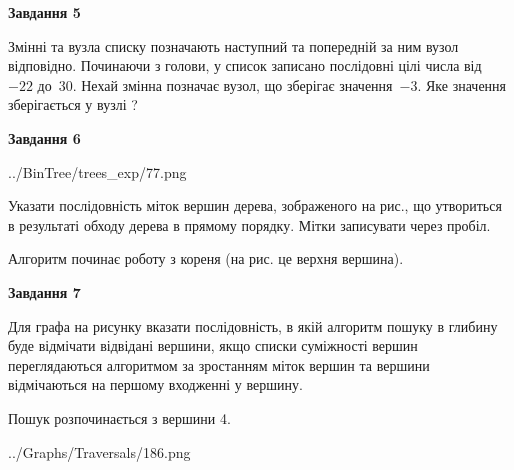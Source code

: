 \documentclass[12pt, ukrainian]{article}
\begin{document}
{\begin {large}
{\begin {center}\textbf{Завдання 5}\end {center}}\par
Змінні  та  вузла списку позначають наступний та попередній за ним вузол відповідно. Починаючи з голови, у список записано послідовні цілі числа від~$-22$ до~$30$. Нехай змінна  позначає вузол, що зберігає значення~$-3$.
Яке значення зберігається у вузлі  ?\par
\newpage

{\begin {center}\textbf{Завдання 6}\end {center}}\par

\begin{center}
	{../BinTree/trees_exp/77.png}
\end{center}
Указати послідовність міток вершин дерева, зображеного на рис., що утвориться в результаті обходу дерева в прямому порядку. Мітки записувати через пробіл.\par Алгоритм починає роботу з кореня (на рис. це верхня вершина).\par
\newpage

{\begin {center}\textbf{Завдання 7}\end {center}}\par
Для графа на рисунку вказати послідовність, в якій алгоритм пошуку в глибину буде відмічати відвідані вершини, якщо списки суміжності вершин переглядаються алгоритмом за зростанням міток вершин та вершини відмічаються на першому вход\-женні у вершину.\par
Пошук розпочинається з вершини 4.\par

\begin{center}
	{../Graphs/Traversals/186.png}
\end{center}\par
\newpage


\end{large}}
\end{document}
